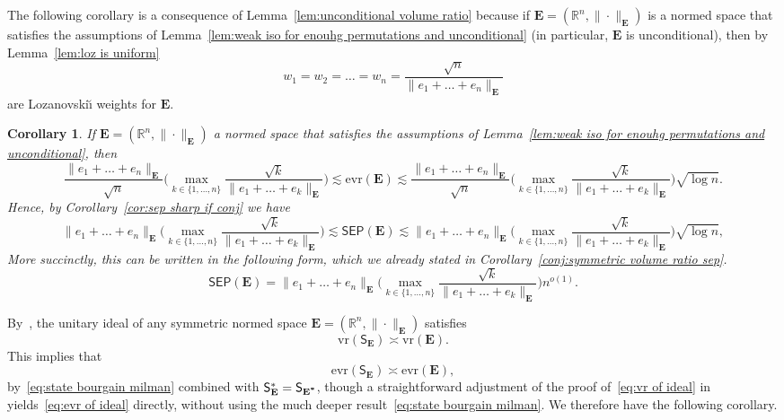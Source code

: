 \documentclass[11pt,reqno]{amsart}
\newcommand{\vr}{\mathrm{vr}}
\newcommand{\evr}{\mathrm{evr}}
\newcommand{\n}{\{1,\ldots,n\}}
\newcommand{\R}{\mathbb R}
\newtheorem{corollary}[theorem]{Corollary}
\theoremstyle{remark}
\newcommand{\EE}{\mathbf{E}}
\newcommand{\sfS}{\mathsf{S}}
\renewcommand{\1}{\mathbf 1}
\newcommand{\sep}{\mathsf{SEP}}
\newcommand{\bfE}{\mathbf{E}}
\begin{document}
The following corollary is a consequence of Lemma~\ref{lem:unconditional volume ratio}  because if $\bfE=(\R^n,\|\cdot\|_{\bfE})$ is a normed space that satisfies the assumptions of Lemma~\ref{lem:weak iso for enouhg permutations and unconditional} (in particular, $\bfE$ is unconditional), then by Lemma~\ref{lem:loz is uniform} $$w_1=w_2=\ldots=w_n=\frac{\sqrt{n}}{\|e_1+\ldots + e_n\|_\bfE}$$ are Lozanovski\u{\i}  weights for $\bfE$.

\begin{corollary}\label{cor:symmetric} If $\bfE=(\R^n,\|\cdot\|_{\bfE})$ a normed space that satisfies the assumptions of Lemma~\ref{lem:weak iso for enouhg permutations and unconditional}, then
$$
\frac{\|e_1+\ldots +e_n\|_\EE}{\sqrt{n}}\bigg(\max_{k\in \n}\frac{\sqrt{k}}{\|e_1+\ldots+e_k\|_\EE}\bigg)\lesssim \evr(\bfE)\lesssim \frac{\|e_1+\ldots +e_n\|_\EE}{\sqrt{n}}\bigg(\max_{k\in \n}\frac{\sqrt{k}}{\|e_1+\ldots+e_k\|_\EE}\bigg) \sqrt{\log n}.
$$
Hence, by Corollary~\ref{cor:sep sharp if conj} we have
$$
\|e_1+\ldots +e_n\|_\EE\bigg(\max_{k\in \n}\frac{\sqrt{k}}{\|e_1+\ldots+e_k\|_\EE}\bigg)\lesssim \sep(\bfE)\lesssim \|e_1+\ldots +e_n\|_\EE\bigg(\max_{k\in \n}\frac{\sqrt{k}}{\|e_1+\ldots+e_k\|_\EE}\bigg)\sqrt{\log n},
$$
More succinctly, this can be written in the following form, which we already stated in Corollary~\ref{conj:symmetric volume ratio sep}.
\begin{equation}\label{sep lpn conj}
\sep(\bfE)= \|e_1+\ldots +e_n\|_\EE\bigg(\max_{k\in \n}\frac{\sqrt{k}}{\|e_1+\ldots+e_k\|_\EE}\bigg) n^{o(1)}.
\end{equation}
\end{corollary}

By~\cite[Proposition~2.2]{Sch82}, the unitary ideal of any  symmetric normed space $\bfE=(\R^n,\|\cdot\|_\bfE)$  satisfies
\begin{equation}\label{eq:vr of ideal}
\vr(\sfS_\bfE)\asymp \vr(\bfE).
\end{equation}
This implies that
\begin{equation}\label{eq:evr of ideal}
\evr(\sfS_\bfE)\asymp \evr(\bfE),
\end{equation}
by~\eqref{eq:state bourgain milman} combined with  $\sfS_\bfE^*=\sfS_{\bfE^{\textbf *}}$, though a straightforward adjustment of the proof of~\eqref{eq:vr of ideal} in~\cite{Sch82} yields~\eqref{eq:evr of ideal} directly,  without using the much deeper result~\eqref{eq:state bourgain milman}.   We therefore have the following corollary.
\end{document}
